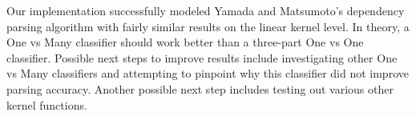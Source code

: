 \documentclass[12pt,fleqn]{article}
\begin{document}
Our implementation successfully modeled Yamada and Matsumoto's dependency parsing algorithm with fairly similar results on the linear kernel level. In theory, a One vs Many classifier should work better than a three-part One vs One classifier. Possible next steps to improve results include investigating other One vs Many classifiers and attempting to pinpoint why this classifier did not improve parsing accuracy. Another possible next step includes testing out various other kernel functions. \\
        
        
\end{document}
